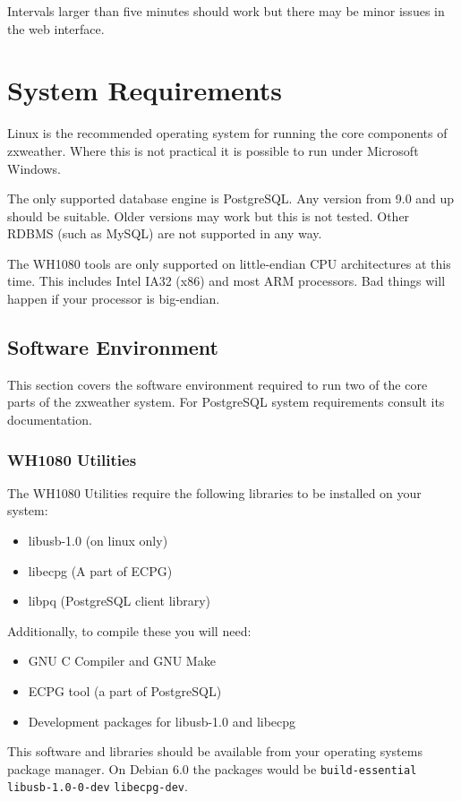 \documentclass[a4paper,10pt,draft]{book}
\begin{document}
Intervals larger than five minutes should work but there may be minor issues in the web interface.

\section{System Requirements}
Linux is the recommended operating system for running the core components of zxweather. Where this is not practical it is possible to run under Microsoft Windows.

The only supported database engine is PostgreSQL. Any version from 9.0 and up should be suitable. Older versions may work but this is not tested. Other RDBMS (such as MySQL) are not supported in any way.

The WH1080 tools are only supported on little-endian CPU architectures at this time. This includes Intel IA32 (x86) and most ARM processors. Bad things will happen if your processor is big-endian.

\subsection{Software Environment}
This section covers the software environment required to run two of the core parts of the zxweather system. For PostgreSQL system requirements consult its documentation.

\subsubsection{WH1080 Utilities}
The WH1080 Utilities require the following libraries to be installed on your system:
\begin{itemize}
\item libusb-1.0 (on linux only)
\item libecpg (A part of ECPG)
\item libpq (PostgreSQL client library)
\end{itemize}

Additionally, to compile these you will need:
\begin{itemize}
\item GNU C Compiler and GNU Make
\item ECPG tool (a part of PostgreSQL)
\item Development packages for libusb-1.0 and libecpg
\end{itemize}

This software and libraries should be available from your operating systems package manager. On Debian 6.0 the packages would be \verb|build-essential| \verb|libusb-1.0-0-dev| \verb|libecpg-dev|.
\end{document}
